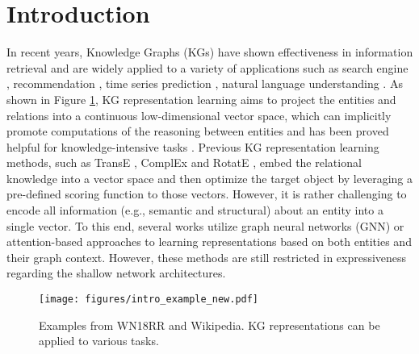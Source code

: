 \documentclass[sigconf]{acmart}
\begin{document}


\maketitle

\section{Introduction}

In recent years, Knowledge Graphs (KGs) have shown effectiveness in information retrieval and are widely applied to a variety of applications such as search engine \cite{xiong2017explicit}, recommendation \cite{liu2021reinforced}, time series prediction \cite{DBLP:conf/www/DengZZCPC19}, natural language understanding \cite{zhang2019ernie,yao2023editing,DBLP:journals/corr/abs-2210-00105}.
As shown in Figure \ref{KG representation}, KG representation learning aims to project the entities and relations into a continuous low-dimensional vector space, which can implicitly promote computations of the reasoning between entities and has been proved helpful for knowledge-intensive tasks \cite{DBLP:journals/corr/abs-2210-00305,DBLP:journals/tnn/JiPCMY22,DBLP:journals/kbs/WuKYQW22,DBLP:journals/tkde/GuoZQZXXH22}.
Previous KG representation learning methods,  such as TransE \cite{TransE}, ComplEx \cite{ComplEx} and RotatE \cite{RotatE},  embed the relational knowledge into a vector space and then optimize the target object by leveraging a pre-defined scoring function to those vectors. 
However, it is rather challenging to encode all information (e.g., semantic and structural) about an entity into a single vector. 
To this end, several works utilize graph neural networks (GNN) \cite{DBLP:conf/esws/SchlichtkrullKB18,DBLP:conf/www/Zhang0YW22} or attention-based approaches \cite{DBLP:conf/kdd/Wang00LC19} to learning representations based on both entities and their graph context.
However, these methods are still restricted in expressiveness regarding the shallow network architectures. 

\begin{figure}[!t]
\centering

\texttt{[image: figures/intro\_example\_new.pdf]}
\caption{
Examples from WN18RR and Wikipedia.
KG representations can be applied to various tasks.}
\label{KG representation}
\end{figure}
\end{document}

